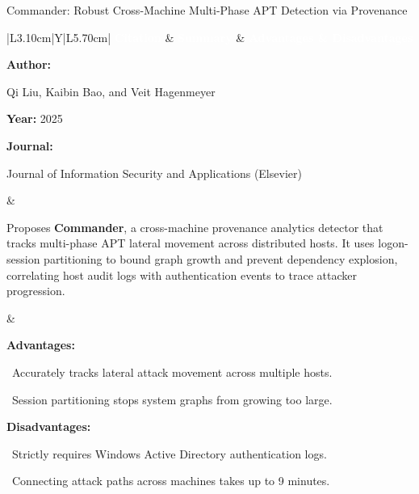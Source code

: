 \documentclass[aspectratio=169,10pt]{beamer}
\newcommand{\lrhdr}{%
  \rowcolor{prismNavy}%
  {\scriptsize\textcolor{white}{\textbf{Citation}}} &
  {\scriptsize\textcolor{white}{\textbf{Summary}}} &
  {\scriptsize\textcolor{white}{\textbf{Advantages \& Disadvantages}}} \\}
\begin{document}
\begin{frame}[t]{Commander: Robust Cross-Machine Multi-Phase APT Detection via Provenance}
\vspace{-0.30em}
{\footnotesize\setlength{\tabcolsep}{3.5pt}\renewcommand{\arraystretch}{1.10}
\begin{tabularx}{\textwidth}{|L{3.10cm}|Y|L{5.70cm}|}
\hline\lrhdr\hline
\begin{minipage}[t]{\linewidth}\fontsize{7.2pt}{9.2pt}\raggedright\selectfont
\textbf{Author:}\par
Qi Liu, Kaibin Bao, and Veit Hagenmeyer\par\vspace{4pt}
\textbf{Year:} 2025\par\vspace{4pt}
\textbf{Journal:}\par
Journal of Information Security and Applications (Elsevier)\par\vspace{4pt}
\end{minipage}
&
\begin{minipage}[t]{\linewidth}\fontsize{7.2pt}{9.2pt}\raggedright\selectfont
Proposes \textbf{Commander}, a cross-machine provenance analytics detector that tracks multi-phase APT lateral movement across distributed hosts. It uses logon-session partitioning to bound graph growth and prevent dependency explosion, correlating host audit logs with authentication events to trace attacker progression.\par\vspace{4pt}
\end{minipage}
&
\begin{minipage}[t]{\linewidth}\fontsize{7.2pt}{9.0pt}\raggedright\selectfont
\textcolor{strengthGreen}{\textbf{Advantages:}}\par\vspace{1.5pt}
\textbullet~Accurately tracks lateral attack movement across multiple hosts.\par\vspace{2.0pt}\textbullet~Session partitioning stops system graphs from growing too large.\par\vspace{4.0pt}
\textcolor{limitRed}{\textbf{Disadvantages:}}\par\vspace{1.5pt}
\textbullet~Strictly requires Windows Active Directory authentication logs.\par\vspace{2.0pt}\textbullet~Connecting attack paths across machines takes up to 9 minutes.\par\vspace{4pt}
\end{minipage} \\\hline
\end{tabularx}}
\end{frame}
\end{document}
